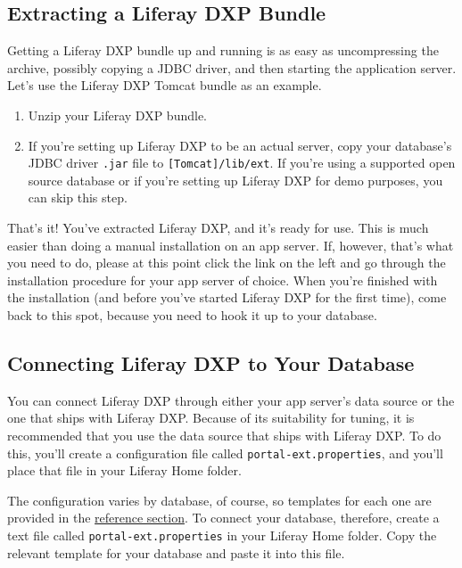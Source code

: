 \subsection{Extracting a Liferay DXP
Bundle}\label{extracting-a-liferay-dxp-bundle}

Getting a Liferay DXP bundle up and running is as easy as uncompressing
the archive, possibly copying a JDBC driver, and then starting the
application server. Let's use the Liferay DXP Tomcat bundle as an
example.

\begin{enumerate}
\def\labelenumi{\arabic{enumi}.}
\item
  Unzip your Liferay DXP bundle.
\item
  If you're setting up Liferay DXP to be an actual server, copy your
  database's JDBC driver \texttt{.jar} file to
  \texttt{{[}Tomcat{]}/lib/ext}. If you're using a supported open source
  database or if you're setting up Liferay DXP for demo purposes, you
  can skip this step.
\end{enumerate}

That's it! You've extracted Liferay DXP, and it's ready for use. This is
much easier than doing a manual installation on an app server. If,
however, that's what you need to do, please at this point click the link
on the left and go through the installation procedure for your app
server of choice. When you're finished with the installation (and before
you've started Liferay DXP for the first time), come back to this spot,
because you need to hook it up to your database.

\subsection{Connecting Liferay DXP to Your
Database}\label{connecting-liferay-dxp-to-your-database}

You can connect Liferay DXP through either your app server's data source
or the one that ships with Liferay DXP. Because of its suitability for
tuning, it is recommended that you use the data source that ships with
Liferay DXP. To do this, you'll create a configuration file called
\texttt{portal-ext.properties}, and you'll place that file in your
Liferay Home folder.

The configuration varies by database, of course, so templates for each
one are provided in the
\href{/docs/7-0/deploy/-/knowledge_base/d/database-templates}{reference
section}. To connect your database, therefore, create a text file called
\texttt{portal-ext.properties} in your Liferay Home folder. Copy the
relevant template for your database and paste it into this file.

